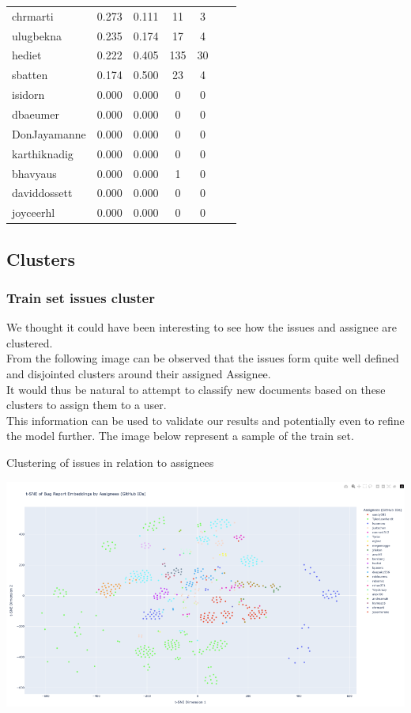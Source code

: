 \documentclass[tikz,10pt,fleqn]{article}
\begin{document}
\begin{table}[H]
\begin{tabular}{@{}lcccccc@{}}
        chrmarti       & 0.273 & 0.111  & 11  & 3   \\
        ulugbekna      & 0.235 & 0.174  & 17  & 4   \\
        hediet         & 0.222 & 0.405  & 135 & 30  \\
        sbatten        & 0.174 & 0.500  & 23  & 4   \\
        isidorn        & 0.000 & 0.000  & 0   & 0   \\
        dbaeumer       & 0.000 & 0.000  & 0   & 0   \\
        DonJayamanne   & 0.000 & 0.000  & 0   & 0   \\
        karthiknadig   & 0.000 & 0.000  & 0   & 0   \\
        bhavyaus       & 0.000 & 0.000  & 1   & 0   \\
        daviddossett   & 0.000 & 0.000  & 0   & 0   \\
        joyceerhl      & 0.000 & 0.000  & 0   & 0   \\ \bottomrule
    \end{tabular}
\end{table}

\subsection*{Clusters}
\subsubsection{Train set issues cluster}
We thought it could have been interesting to see how the issues and assignee are clustered.\\
From the following image can be observed that the issues form quite well defined and disjointed clusters around their assigned Assignee.\\
It would thus be natural to attempt to classify new documents based on these clusters to assign them to a user.\\
This information can be used to validate our results and potentially even to refine the model further.
The image below represent a sample of the train set.
\begin{table}[H]
	\centering
	\caption{Clustering of issues in relation to assignees}
	\includegraphics[width=\textwidth]{plot.png}
\end{table}
\end{document}

